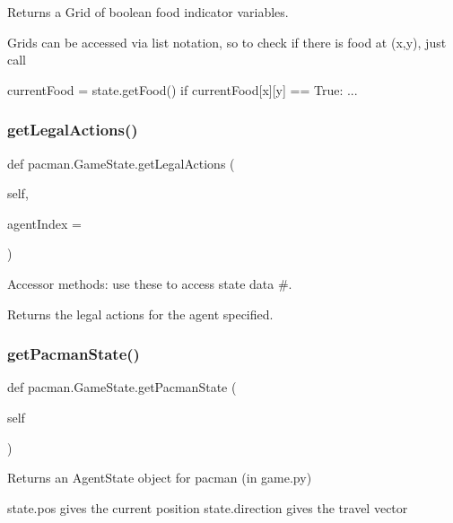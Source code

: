 \begin{DoxyVerb}Returns a Grid of boolean food indicator variables.

Grids can be accessed via list notation, so to check
if there is food at (x,y), just call

currentFood = state.getFood()
if currentFood[x][y] == True: ...
\end{DoxyVerb}
 \mbox{\label{classpacman_1_1_game_state_a052ecff567f806c589fa08f21c8d3b15}} 
\subsubsection{\texorpdfstring{get\+Legal\+Actions()}{getLegalActions()}}
{\footnotesize\ttfamily def pacman.\+Game\+State.\+get\+Legal\+Actions (\begin{DoxyParamCaption}\item[{}]{self,  }\item[{}]{agent\+Index = {} }\end{DoxyParamCaption})}



Accessor methods\+: use these to access state data \#. 

\begin{DoxyVerb}Returns the legal actions for the agent specified.
\end{DoxyVerb}
 \mbox{\label{classpacman_1_1_game_state_a5e17856afbfa1f0a0fbafcff73878fd8}} 
\subsubsection{\texorpdfstring{get\+Pacman\+State()}{getPacmanState()}}
{\footnotesize\ttfamily def pacman.\+Game\+State.\+get\+Pacman\+State (\begin{DoxyParamCaption}\item[{}]{self }\end{DoxyParamCaption})}

\begin{DoxyVerb}Returns an AgentState object for pacman (in game.py)

state.pos gives the current position
state.direction gives the travel vector
\end{DoxyVerb}
 \mbox{\label{classpacman_1_1_game_state_a770ccd37a37643829098559de97f4b09}} 
